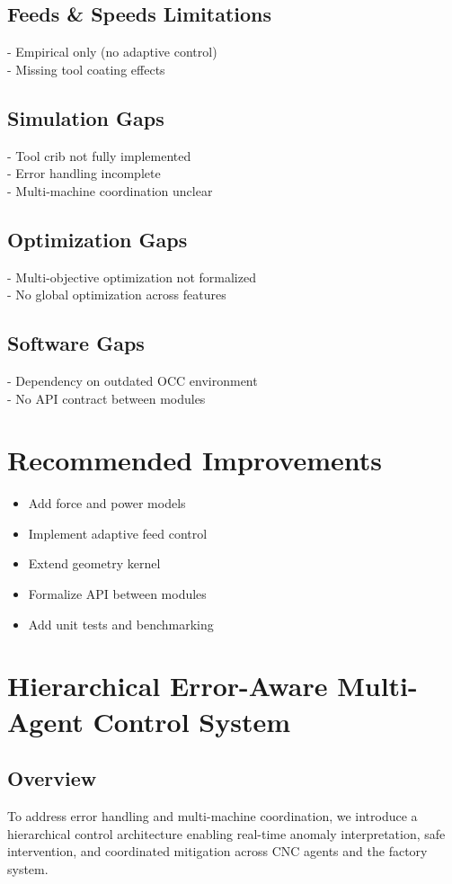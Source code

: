 \documentclass{article}
\begin{document}
\subsection{Feeds \& Speeds Limitations}
- Empirical only (no adaptive control) \\
- Missing tool coating effects

\subsection{Simulation Gaps}
- Tool crib not fully implemented \\
- Error handling incomplete \\
- Multi-machine coordination unclear

\subsection{Optimization Gaps}
- Multi-objective optimization not formalized \\
- No global optimization across features

\subsection{Software Gaps}
- Dependency on outdated OCC environment \\
- No API contract between modules

\section{Recommended Improvements}
\begin{itemize}
\item Add force and power models
\item Implement adaptive feed control
\item Extend geometry kernel
\item Formalize API between modules
\item Add unit tests and benchmarking
\end{itemize}

\section{Hierarchical Error-Aware Multi-Agent Control System}

\subsection{Overview}
To address error handling and multi-machine coordination, we introduce a hierarchical control architecture enabling real-time anomaly interpretation, safe intervention, and coordinated mitigation across CNC agents and the factory system.
\end{document}
